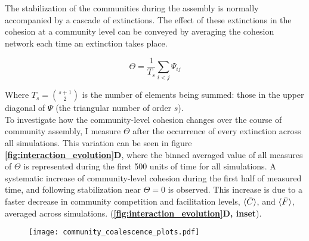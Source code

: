 \documentclass[titlepage,11pt]{article}
\begin{document}
\begin{linenumbers}
\begin{singlespace}
			The stabilization of the communities during the assembly is normally accompanied by a cascade of extinctions. The effect of these extinctions in the cohesion at a community level can be conveyed by averaging the cohesion network each time an extinction takes place.
			\begin{linenomath*}
				\begin{equation}
					\Theta = \frac{1}{T_s}\sum_{i < j}\Psi_{ij}
				\end{equation}
			\end{linenomath*}
			Where $T_s = {s+1 \choose 2} $ is the number of elements being summed: those in the upper diagonal of $ \Psi $ (the triangular number of order $ s $).\\
			To investigate how the community-level cohesion changes over the course of community assembly, I measure $ \Theta $ after the occurrence of every extinction across all simulations. This variation can be seen in figure \textbf{\ref{fig:interaction_evolution}D}, where the binned averaged value of all measures of $ \Theta $ is represented during the first 500 units of time for all simulations. A systematic increase of community-level cohesion during the first half of measured time, and following stabilization near $ \Theta = 0 $ is observed. This increase is due to a faster decrease in community competition and facilitation levels, $ \braket{\bar{C}} $, and $ \braket{\bar{F}} $, averaged across simulations.  (\textbf{\ref{fig:interaction_evolution}D, inset}).\\
			\begin{figure}
				\centering			
				\texttt{[image: community\_coalescence\_plots.pdf]}

\end{figure}
\end{singlespace}
\end{linenumbers}
\end{document}

